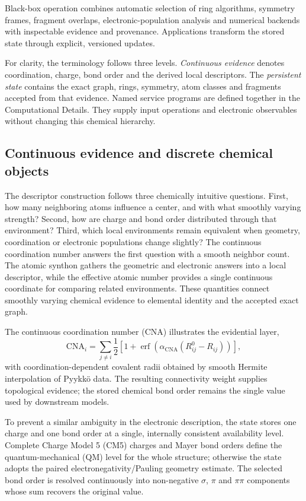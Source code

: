 \documentclass[journal=jctcce,manuscript=article]{achemso}
\begin{document}
Black-box operation combines automatic selection of ring algorithms, symmetry
frames, fragment overlaps, electronic-population analysis and numerical
backends with inspectable evidence and provenance.  Applications transform
the stored state through explicit, versioned updates.

For clarity, the terminology follows three levels.  \emph{Continuous
evidence} denotes coordination, charge, bond order and the derived local
descriptors.  The \emph{persistent state} contains the exact graph, rings,
symmetry, atom classes and fragments accepted from that evidence.  Named
service programs are defined together in the Computational Details.  They
supply input operations and electronic observables without changing this
chemical hierarchy.

\subsection{Continuous evidence and discrete chemical objects}

The descriptor construction follows three chemically intuitive questions.
First, how many neighboring atoms influence a center, and with what smoothly
varying strength?  Second, how are charge and bond order distributed through
that environment?  Third, which local environments remain equivalent when
geometry, coordination or electronic populations change slightly?  The
continuous coordination number answers the first question with a smooth
neighbor count.  The atomic synthon gathers the geometric and electronic
answers into a local descriptor, while the effective atomic number provides a
single continuous coordinate for comparing related environments.  These
quantities connect smoothly varying chemical evidence to elemental identity
and the accepted exact graph.

The continuous coordination number (CNA) illustrates the evidential layer,
\begin{equation}
\mathrm{CNA}_i=\sum_{j\ne i}\frac{1}{2}
\left[1+\operatorname{erf}\!\left(
\alpha_{\mathrm{CNA}}(R^0_{ij}-R_{ij})\right)\right],
\end{equation}
with coordination-dependent covalent radii obtained by smooth Hermite
interpolation of Pyykk\"o data.\cite{pyykko_radii_2009}  The resulting
connectivity weight supplies topological evidence; the stored chemical bond
order remains the single value used by downstream models.

To prevent a similar ambiguity in the electronic description, the state stores
one charge and one bond order at a single, internally consistent availability
level.  Complete Charge Model 5 (CM5) charges and Mayer bond orders define the
quantum-mechanical (QM) level for the whole structure;
\cite{cm5_2012,mayer_bond_order_1983} otherwise the state adopts the paired
electronegativity/Pauling geometry estimate.  The selected bond order is
resolved continuously into non-negative $\sigma$, $\pi$ and $\pi\pi$
components whose sum recovers the original value.
\end{document}
